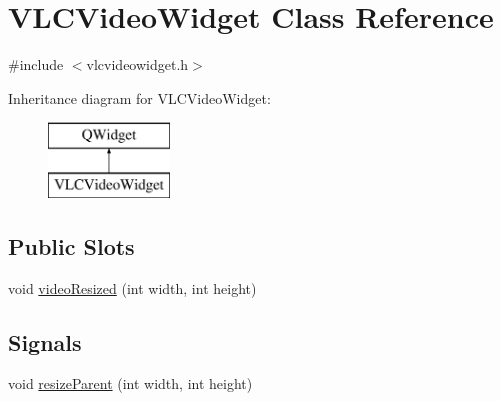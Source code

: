 \hypertarget{classVLCVideoWidget}{\section{V\-L\-C\-Video\-Widget Class Reference}
\label{classVLCVideoWidget}
}


{\ttfamily \#include $<$vlcvideowidget.\-h$>$}

Inheritance diagram for V\-L\-C\-Video\-Widget\-:\begin{figure}[H]
\begin{center}
\leavevmode
\includegraphics[height=2.000000cm]{classVLCVideoWidget}
\end{center}
\end{figure}
\subsection*{Public Slots}
\begin{DoxyCompactItemize}
\item 
void \hyperlink{classVLCVideoWidget_aff4501569b0e46b3641625c3c9bbd5c6}{video\-Resized} (int width, int height)
\end{DoxyCompactItemize}
\subsection*{Signals}
\begin{DoxyCompactItemize}
\item 
void \hyperlink{classVLCVideoWidget_aeff3477d9c077d45b0ff8caea2514150}{resize\-Parent} (int width, int height)
\end{DoxyCompactItemize}
